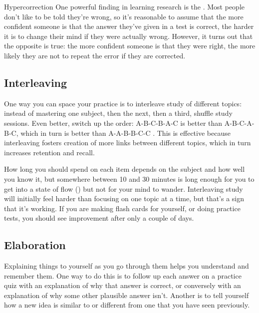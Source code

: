 \begin{aside}{Hypercorrection}
  One powerful finding in learning research is the  \cite{Metc2016}. Most people don't
  like to be told they're wrong, so it's reasonable to assume that the
  more confident someone is that the answer they've given in a test is
  correct, the harder it is to change their mind if they were actually
  wrong. However, it turns out that the opposite is true: the more
  confident someone is that they were right, the more likely they are
  not to repeat the error if they are corrected.
\end{aside}

\subsection*{Interleaving}

One way you can space your practice is to interleave study of different
topics: instead of mastering one subject, then the next, then a third,
shuffle study sessions. Even better, switch up the order: A-B-C-B-A-C is
better than A-B-C-A-B-C, which in turn is better than A-A-B-B-C-C
\cite{Rohrer2015}. This is effective because interleaving fosters
creation of more links between different topics, which in turn increases
retention and recall.

How long you should spend on each item depends on the subject and how
well you know it, but somewhere between 10 and 30 minutes is long enough
for you to get into a state of flow () but
not for your mind to wander. Interleaving study will initially feel
harder than focusing on one topic at a time, but that's a sign that it's
working. If you are making flash cards for yourself, or doing practice
tests, you should see improvement after only a couple of days.

\subsection*{Elaboration}

Explaining things to yourself as you go through them helps you
understand and remember them. One way to do this is to follow up each
answer on a practice quiz with an explanation of why that answer is
correct, or conversely with an explanation of why some other plausible
answer isn't. Another is to tell yourself how a new idea is similar to
or different from one that you have seen previously.

